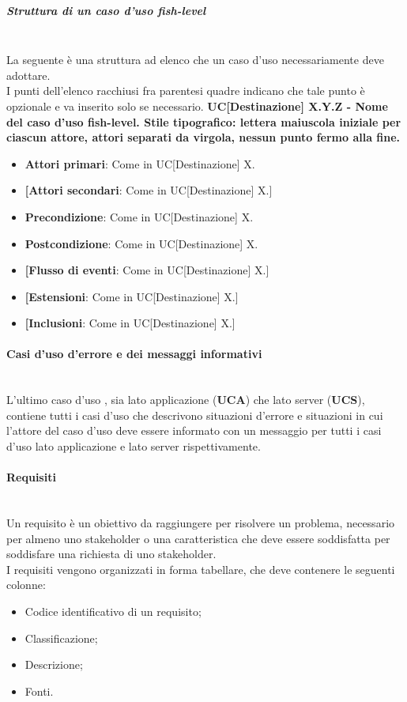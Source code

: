 \subparagraph*{Struttura di un caso d'uso fish-level}\mbox{}\\
La seguente è una struttura ad elenco che un caso d'uso  necessariamente deve adottare.\\
I punti dell'elenco racchiusi fra parentesi quadre indicano che tale punto è opzionale e va inserito solo se necessario.
\textbf{UC[Destinazione] X.Y.Z - Nome del caso d'uso fish-level. Stile tipografico: lettera maiuscola iniziale per ciascun attore, attori separati da virgola, nessun punto fermo alla fine.}%
\begin{itemize}
	\item \textbf{Attori primari}: Come in UC[Destinazione] X.
	\item \textbf{[Attori secondari}: Come in UC[Destinazione] X.]
	\item \textbf{Precondizione}: Come in UC[Destinazione] X.
	\item \textbf{Postcondizione}: Come in UC[Destinazione] X.
	\item \textbf{[Flusso di eventi}: Come in UC[Destinazione] X.]
	\item \textbf{[Estensioni}: Come in UC[Destinazione] X.]
	\item \textbf{[Inclusioni}: Come in UC[Destinazione] X.]
\end{itemize}

\paragraph{Casi d'uso d'errore e dei messaggi informativi}\mbox{}\\
L'ultimo caso d'uso , sia lato applicazione (\textbf{UCA}) che lato server (\textbf{UCS}), contiene tutti i casi d'uso che descrivono situazioni d'errore e situazioni in cui l'attore del caso d'uso deve essere informato con un messaggio per tutti i casi d'uso lato applicazione e lato server rispettivamente.\\
\paragraph{Requisiti}\mbox{}\\
Un requisito è un obiettivo da raggiungere per risolvere un problema, necessario per almeno uno stakeholder o una caratteristica che deve essere soddisfatta per soddisfare una richiesta di uno stakeholder. \\
I requisiti vengono organizzati in forma tabellare, che deve contenere le seguenti colonne:
\begin{itemize}
	\item Codice identificativo di un requisito;
	\item Classificazione;
	\item Descrizione;
	\item Fonti.
\end{itemize}

